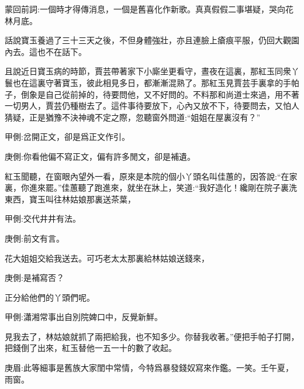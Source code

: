 

\begin{parag}
    \begin{note}蒙回前詞:一個時才得傳消息，一個是舊喜化作新歌。真真假假二事堪疑，哭向花林月底。\end{note}
\end{parag}


\begin{parag}
    話說寶玉養過了三十三天之後，不但身體強壯，亦且連臉上瘡痕平服，仍回大觀園內去。這也不在話下。
\end{parag}


\begin{parag}
    且說近日寶玉病的時節，賈芸帶著家下小廝坐更看守，晝夜在這裏，那紅玉同衆丫鬟也在這裏守著寶玉，彼此相見多日，都漸漸混熟了。那紅玉見賈芸手裏拿的手帕子，倒象是自己從前掉的，待要問他，又不好問的。不料那和尚道士來過，用不著一切男人，賈芸仍種樹去了。這件事待要放下，心內又放不下，待要問去，又怕人猜疑，正是猶豫不決神魂不定之際，忽聽窗外問道:“姐姐在屋裏沒有？”\begin{note}甲側:岔開正文，卻是爲正文作引。\end{note}\begin{note}庚側:你看他偏不寫正文，偏有許多閒文，卻是補遺。\end{note}紅玉聞聽，在窗眼內望外一看，原來是本院的個小丫頭名叫佳蕙的，因答說:“在家裏，你進來罷。”佳蕙聽了跑進來，就坐在牀上，笑道:“我好造化！纔剛在院子裏洗東西，寶玉叫往林姑娘那裏送茶葉，\begin{note}甲側:交代井井有法。\end{note}\begin{note}庚側:前文有言。\end{note}花大姐姐交給我送去。可巧老太太那裏給林姑娘送錢來，\begin{note}庚側:是補寫否？\end{note}正分給他們的丫頭們呢。\begin{note}甲側:瀟湘常事出自別院婢口中，反覺新鮮。\end{note}見我去了，林姑娘就抓了兩把給我，也不知多少。你替我收著。”便把手帕子打開，把錢倒了出來，紅玉替他一五一十的數了收起。\begin{note}庚眉:此等細事是舊族大家閨中常情，今特爲暴發錢奴寫來作鑑。一笑。壬午夏，雨窗。\end{note}
\end{parag}


